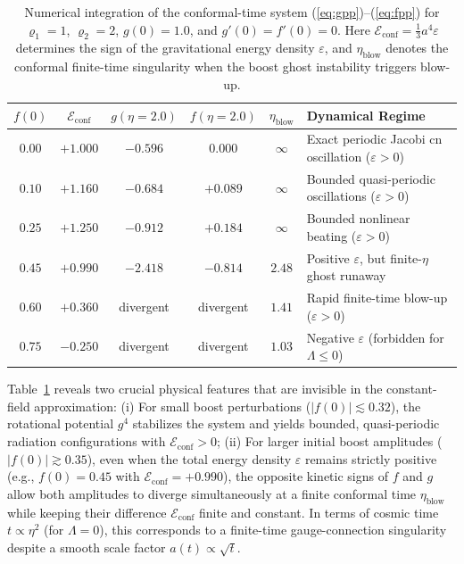 \documentclass[11pt, a4paper]{article}
\newcommand{\subst}[1]{\textcolor{substantive}{#1}}
\begin{document}
\begin{table}[h!]
\centering
\caption{\subst{Numerical integration of the conformal-time system (\ref{eq:gpp})--(\ref{eq:fpp}) for $\varrho_1 = 1$, $\varrho_2 = 2$, $g(0)=1.0$, and $g'(0)=f'(0)=0$. Here $\mathcal{E}_{\mathrm{conf}} = \frac{1}{3}a^4\varepsilon$ determines the sign of the gravitational energy density $\varepsilon$, and $\eta_{\mathrm{blow}}$ denotes the conformal finite-time singularity when the boost ghost instability triggers blow-up.}}
\label{tab:num_analysis}
\vspace{0.4em}
\begin{tabular}{@{}cccccl@{}}
\toprule
\subst{$f(0)$} & \subst{$\mathcal{E}_{\mathrm{conf}}$} & \subst{$g(\eta=2.0)$} & \subst{$f(\eta=2.0)$} & \subst{$\eta_{\mathrm{blow}}$} & \subst{Dynamical Regime} \\
\midrule
\subst{$0.00$} & \subst{$+1.000$} & \subst{$-0.596$} & \subst{$0.000$} & \subst{$\infty$} & \subst{Exact periodic Jacobi $\mathrm{cn}$ oscillation ($\varepsilon > 0$)} \\
\subst{$0.10$} & \subst{$+1.160$} & \subst{$-0.684$} & \subst{$+0.089$} & \subst{$\infty$} & \subst{Bounded quasi-periodic oscillations ($\varepsilon > 0$)} \\
\subst{$0.25$} & \subst{$+1.250$} & \subst{$-0.912$} & \subst{$+0.184$} & \subst{$\infty$} & \subst{Bounded nonlinear beating ($\varepsilon > 0$)} \\
\subst{$0.45$} & \subst{$+0.990$} & \subst{$-2.418$} & \subst{$-0.814$} & \subst{$2.48$} & \subst{Positive $\varepsilon$, but finite-$\eta$ ghost runaway} \\
\subst{$0.60$} & \subst{$+0.360$} & \subst{divergent} & \subst{divergent} & \subst{$1.41$} & \subst{Rapid finite-time blow-up ($\varepsilon > 0$)} \\
\subst{$0.75$} & \subst{$-0.250$} & \subst{divergent} & \subst{divergent} & \subst{$1.03$} & \subst{Negative $\varepsilon$ (forbidden for $\Lambda \le 0$)} \\
\bottomrule
\end{tabular}
\end{table}

\subst{Table~\ref{tab:num_analysis} reveals two crucial physical features that are invisible in the constant-field approximation:
(i) For small boost perturbations ($|f(0)| \lesssim 0.32$), the rotational potential $g^4$ stabilizes the system and yields bounded, quasi-periodic radiation configurations with $\mathcal{E}_{\mathrm{conf}} > 0$;
(ii) For larger initial boost amplitudes ($|f(0)| \gtrsim 0.35$), even when the total energy density $\varepsilon$ remains strictly positive (e.g., $f(0) = 0.45$ with $\mathcal{E}_{\mathrm{conf}} = +0.990$), the opposite kinetic signs of $f$ and $g$ allow both amplitudes to diverge simultaneously at a finite conformal time $\eta_{\mathrm{blow}}$ while keeping their difference $\mathcal{E}_{\mathrm{conf}}$ finite and constant. In terms of cosmic time $t \propto \eta^2$ (for $\Lambda = 0$), this corresponds to a finite-time gauge-connection singularity despite a smooth scale factor $a(t) \propto \sqrt{t}$.}
\end{document}
